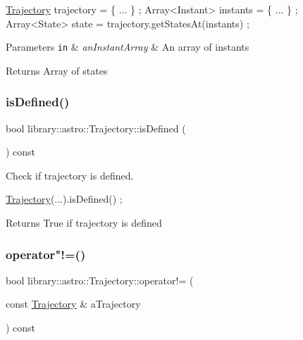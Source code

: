 \begin{DoxyCode}
\hyperlink{classlibrary_1_1astro_1_1_trajectory_a8e5c7740915ca947e067c0f419ac1c65}{Trajectory} trajectory = \{ ... \} ;
Array<Instant> instants = \{ ... \} ;
Array<State> state = trajectory.getStatesAt(instants) ;
\end{DoxyCode}



\begin{DoxyParams}[1]{Parameters}
\mbox{\tt in}  & {\em an\+Instant\+Array} & An array of instants \\
\hline
\end{DoxyParams}
\begin{DoxyReturn}{Returns}
Array of states 
\end{DoxyReturn}
\mbox{\label{classlibrary_1_1astro_1_1_trajectory_aab36edc2566e11d4b5de340cd8230dee}} 
\subsubsection{\texorpdfstring{is\+Defined()}{isDefined()}}
{\footnotesize\ttfamily bool library\+::astro\+::\+Trajectory\+::is\+Defined (\begin{DoxyParamCaption}{ }\end{DoxyParamCaption}) const}



Check if trajectory is defined. 


\begin{DoxyCode}
\hyperlink{classlibrary_1_1astro_1_1_trajectory_a8e5c7740915ca947e067c0f419ac1c65}{Trajectory}(...).isDefined() ;
\end{DoxyCode}


\begin{DoxyReturn}{Returns}
True if trajectory is defined 
\end{DoxyReturn}
\mbox{\label{classlibrary_1_1astro_1_1_trajectory_a3fa102c5193028fabe84aa7cee9b3e55}} 
\subsubsection{\texorpdfstring{operator"!=()}{operator!=()}}
{\footnotesize\ttfamily bool library\+::astro\+::\+Trajectory\+::operator!= (\begin{DoxyParamCaption}\item[{const \hyperlink{classlibrary_1_1astro_1_1_trajectory}{Trajectory} \&}]{a\+Trajectory }\end{DoxyParamCaption}) const}



